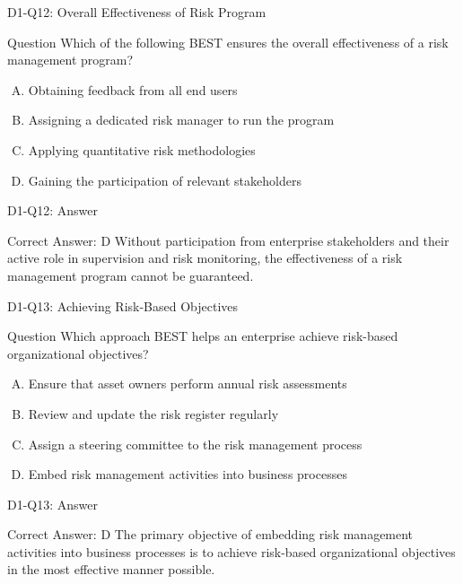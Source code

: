 \documentclass{beamer}
\begin{document}
	\begin{frame}{D1-Q12: Overall Effectiveness of Risk Program}
		\begin{block}{Question}
			Which of the following BEST ensures the overall effectiveness of a risk management program?
		\end{block}
		\begin{enumerate}[(A)]
			\item Obtaining feedback from all end users
			\item Assigning a dedicated risk manager to run the program
			\item Applying quantitative risk methodologies
			\item Gaining the participation of relevant stakeholders
		\end{enumerate}
	\end{frame}
	\begin{frame}{D1-Q12: Answer}
		\begin{block}{Correct Answer: D}
			Without participation from enterprise stakeholders and their active role in supervision and risk monitoring, the effectiveness of a risk management program cannot be guaranteed.
		\end{block}
	\end{frame}
	
	\begin{frame}{D1-Q13: Achieving Risk-Based Objectives}
		\begin{block}{Question}
			Which approach BEST helps an enterprise achieve risk-based organizational objectives?
		\end{block}
		\begin{enumerate}[(A)]
			\item Ensure that asset owners perform annual risk assessments
			\item Review and update the risk register regularly
			\item Assign a steering committee to the risk management process
			\item Embed risk management activities into business processes
		\end{enumerate}
	\end{frame}
	\begin{frame}{D1-Q13: Answer}
		\begin{block}{Correct Answer: D}
			The primary objective of embedding risk management activities into business processes is to achieve risk-based organizational objectives in the most effective manner possible.
		\end{block}
	\end{frame}
	
\end{document}
